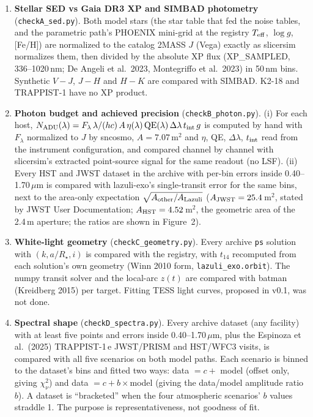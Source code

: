 \documentclass[11pt]{article}
\begin{document}
\begin{enumerate}[leftmargin=*,label=\textbf{\Alph*.}]
  \item \textbf{Stellar SED vs Gaia DR3 XP and SIMBAD photometry} (\texttt{checkA\_sed.py}). Both model stars (the star table that fed the noise tables, and the parametric path's PHOENIX mini-grid at the registry $T_{\rm eff}$, $\log g$, [Fe/H]) are normalized to the catalog 2MASS $J$ (Vega) exactly as slicersim normalizes them, then divided by the absolute XP flux (XP\_SAMPLED, 336--1020\,nm; De Angeli et al.\ 2023, Montegriffo et al.\ 2023) in 50\,nm bins. Synthetic $V{-}J$, $J{-}H$ and $H{-}K$ are compared with SIMBAD. K2-18 and TRAPPIST-1 have no XP product.
  \item \textbf{Photon budget and achieved precision} (\texttt{checkB\_photon.py}). (i) For each host, $N_{\rm ADU}(\lambda)=F_\lambda\,\lambda/(hc)\,A\,\eta(\lambda)\,{\rm QE}(\lambda)\,\Delta\lambda\,t_{\rm int}\,g$ is computed by hand with $F_\lambda$ normalized to $J$ by sncosmo, $A=7.07$\,m$^2$ and $\eta$, QE, $\Delta\lambda$, $t_{\rm int}$ read from the instrument configuration, and compared channel by channel with slicersim's extracted point-source signal for the same readout (no LSF). (ii) Every HST and JWST dataset in the archive with per-bin errors inside 0.40--1.70\,$\mu$m is compared with lazuli-exo's single-transit error for the same bins, next to the area-only expectation $\sqrt{A_{\rm other}/A_{\rm Lazuli}}$ ($A_{\rm JWST}=25.4$\,m$^2$, stated by JWST User Documentation; $A_{\rm HST}=4.52$\,m$^2$, the geometric area of the 2.4\,m aperture; the ratios are shown in Figure~2).
  \item \textbf{White-light geometry} (\texttt{checkC\_geometry.py}). Every archive \texttt{ps} solution with $(k, a/R_\star, i)$ is compared with the registry, with $t_{14}$ recomputed from each solution's own geometry (Winn 2010 form, \texttt{lazuli\_exo.orbit}). The numpy transit solver and the local-arc $z(t)$ are compared with batman (Kreidberg 2015) per target. Fitting TESS light curves, proposed in v0.1, was not done.
  \item \textbf{Spectral shape} (\texttt{checkD\_spectra.py}). Every archive dataset (any facility) with at least five points and errors inside 0.40--1.70\,$\mu$m, plus the Espinoza et al.\ (2025) TRAPPIST-1\,e JWST/PRISM and HST/WFC3 visits, is compared with all five scenarios on both model paths. Each scenario is binned to the dataset's bins and fitted two ways: data $=c+$ model (offset only, giving $\chi^2_\nu$) and data $=c+b\times$model (giving the data/model amplitude ratio $b$). A dataset is ``bracketed'' when the four atmospheric scenarios' $b$ values straddle 1. The purpose is representativeness, not goodness of fit.

\end{enumerate}
\end{document}
